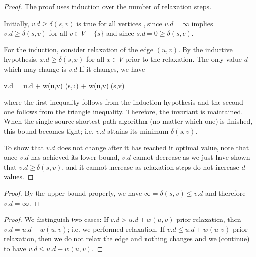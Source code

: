 \begin{proof}
  The proof uses induction over the number of relaxation steps.

  Initially, $v.d \geq \delta(s,v)$ is true for all vertices , since $v.d = \infty$ implies $v.d \geq \delta(s,v)$ for all $v \in V - \{s\}$ and since $s.d=0 \geq \delta(s,v)$.

  For the induction, consider relaxation of the edge $(u,v)$. By the inductive hypothesis, $x.d \geq \delta(s,x)$ for  all $x \in V$ prior to the relaxation. The only value $d$ which may change is $v.d$ If it changes, we have

  \bee
    v.d = u.d + w(u,v) \geq \delta(s,u) + w(u,v) \geq \delta(s,v)
  \eee

  where the first inequality follows from the induction hypothesis and the second one follows from the triangle inequality. Therefore, the invariant is maintained. When the single-source shortest path algorithm (no matter which one) is finished, this bound becomes tight; i.e. $v.d$ attains its minimum $\delta(s,v)$.

  To show that $v.d$ does not change after it has reached it optimal value, note that once $v.d$ has achieved its lower bound, $v.d$ cannot decrease as we just have shown that $v.d \geq \delta(s,v)$, and it cannot increase as relaxation steps do not increase $d$ values. 

\end{proof}


\begin{proof}
By the upper-bound property, we have $\infty = \delta(s,v) \leq v.d$ and therefore $v.d = \infty$.
\end{proof}



\begin{proof}
  We distinguish two cases: If $v.d > u.d + w(u,v)$ prior relaxation, then $v.d = u.d + w(u,v)$; i.e. we performed relaxation. If $v.d \leq u.d + w(u,v)$ prior relaxation, then we do not relax the edge and nothing changes and we (continue) to have $v.d \leq u.d + w(u,v)$.
\end{proof}


